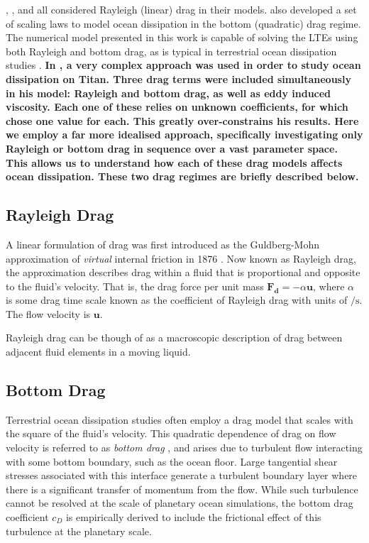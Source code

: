 \citet{tyler2011tidal}, \citet{matsuyama2014tidal}, and \citet{chen2013tidal} all considered Rayleigh (linear) drag in their models.  \citet{chen2013tidal} also developed a set of scaling laws to model ocean dissipation in the bottom (quadratic) drag regime. The numerical model presented in this work is capable of solving the LTEs using both Rayleigh and bottom drag, as is typical in terrestrial ocean dissipation studies \citep{taylor1920tidal,jeffreys1921tidal,zahel1977global,egbert2001estimates,jayne2001parameterizing}.  \textbf{In \citet{sears1995tidal}, a very complex approach was used in order to study ocean dissipation on Titan. Three drag terms were included simultaneously in his model: Rayleigh and bottom drag, as well as eddy induced viscosity. Each one of these relies on unknown coefficients, for which \citet{sears1995tidal} chose one value for each. This greatly over-constrains his results. Here we employ a far more idealised approach, specifically investigating only Rayleigh or bottom drag in sequence over a vast parameter space. This allows us to understand how each of these drag models affects ocean dissipation. These two drag regimes are briefly described below.}

\subsection{Rayleigh Drag}

A linear formulation of drag was first introduced as the Guldberg-Mohn approximation of \textit{virtual} internal friction in 1876 \citep{neumann1968ocean}. Now known as Rayleigh drag, the approximation describes drag within a fluid that is proportional and opposite to the fluid's velocity. That is, the drag force per unit mass $\bm{F_d} = -\alpha \bm{u}$, where $\alpha$ is some drag time scale known as the coefficient of Rayleigh drag with units of $\si{\per\second}$. The flow velocity is $\bm{u}$. 

Rayleigh drag can be though of as a macroscopic description of drag between adjacent fluid elements in a moving liquid.

\subsection{Bottom Drag}

Terrestrial ocean dissipation studies often employ a drag model that scales with the square of the fluid's velocity. This quadratic dependence of drag on flow velocity is referred to as \textit{bottom drag} \citep{gill1982atmosphere}, and arises due to turbulent flow interacting with some bottom boundary, such as the ocean floor. Large tangential shear stresses associated with this interface generate a turbulent boundary layer where there is a significant transfer of momentum from the flow. While such turbulence cannot be resolved at the scale of planetary ocean simulations, the bottom drag coefficient $c_D$ is empirically derived to include the frictional effect of this turbulence at the planetary scale.

